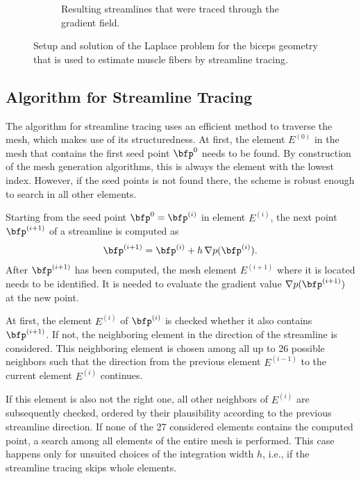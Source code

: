 \begin{figure}
\begin{subfigure}[t]{0.48\textwidth}
    \caption{Resulting streamlines that were traced through the gradient field.}%
    \label{fig:fiber_tracing_streamlines}%
  \end{subfigure}
  \caption{Setup and solution of the Laplace problem for the biceps geometry that is used to estimate muscle fibers by streamline tracing.}%
  \label{fig:potential_flow_streamlines}%
\end{figure}%

\subsection{Algorithm for Streamline Tracing}\label{sec:algorithm_for_streamline_tracing}
The algorithm for streamline tracing uses an efficient method to traverse the mesh, which makes use of its structuredness.
At first, the element $E^{(0)}$ in the mesh that contains the first seed point $\bfp^0$ needs to be found. By construction of the mesh generation algorithms, this is always the element with the lowest index. 
However, if the seed points is not found there, the scheme is robust enough to search in all other elements.

Starting from the seed point $\bfp^0 = \bfp^{(i)}$ in element $E^{(i)}$, the next point $\bfp^{(i+1)}$ of a streamline is computed as %
\begin{align*}
  \bfp^{(i+1)} = \bfp^{(i)} + h\,\nabla p (\bfp^{(i)}).
\end{align*}
After $\bfp^{(i+1)}$ has been computed, the mesh element $E^{(i+1)}$ where it is located needs to be identified. It is needed to evaluate the gradient value $\nabla p (\bfp^{(i+1)})$ at the new point. 

At first, the element $E^{(i)}$ of $\bfp^{(i)}$ is checked whether it also contains $\bfp^{(i+1)}$. If not, the neighboring element in the direction of the streamline is considered. This neighboring element is chosen among all up to 26 possible neighbors such that the direction from the previous element $E^{(i-1)}$ to the current element $E^{(i)}$ continues.

If this element is also not the right one, all other neighbors of $E^{(i)}$ are subsequently checked, ordered by their plausibility according to the previous streamline direction. If none of the 27 considered elements contains the computed point, a search among all elements of the entire mesh is performed. This case happens only for unsuited choices of the integration width $h$, i.e., if the streamline tracing skips whole elements.

